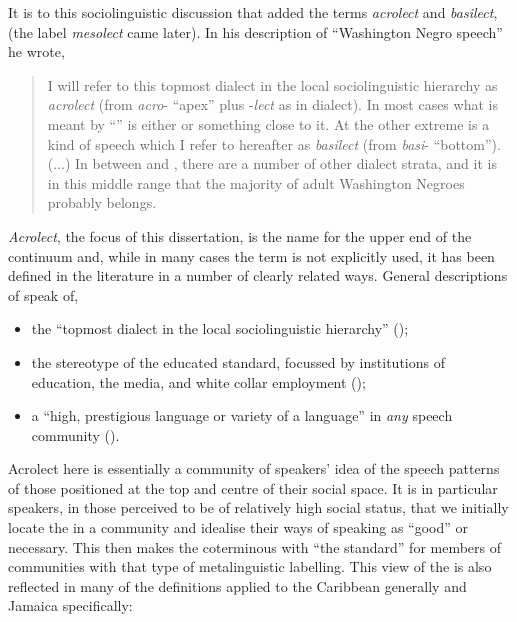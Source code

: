 It is to this sociolinguistic discussion that \citet[15--16]{Stewart1965} added the terms \textit{acrolect} and \textit{basilect}, (the label \textit{mesolect} came later).  In his description of “Washington Negro speech” he wrote,

\begin{quote}
I will refer to this topmost dialect in the local sociolinguistic hierarchy as \textit{acrolect} (from \textit{acro}- “apex” plus -\textit{lect} as in dialect).  In most cases what is meant by “” is either  or something close to it.  At the other extreme is a kind of speech which I refer to hereafter as \textit{basilect} (from \textit{basi}- “bottom”). (...) In between  and , there are a number of other dialect strata, and it is in this middle range that the majority of adult Washington Negroes probably belongs.  
\end{quote}

\textit{Acrolect}, the focus of this dissertation, is the name for the upper end of the continuum and, while in many cases the term is not explicitly used, it has been defined in the literature in a number of clearly related ways.  General descriptions of  speak of,  

\begin{itemize}
\item the “topmost dialect in the local sociolinguistic hierarchy” (\citealt[15]{Stewart1965});   
\item the stereotype of the educated standard, focussed by institutions of education, the media, and white collar employment (\citealt[34--35]{LePage1988});
\item a “high, prestigious language or variety of a language” in \textit{any} speech community (\citealt[xvii]{McArthur1998}).
\end{itemize}

Acrolect here is essentially a community of speakers’ idea of the speech patterns of those positioned at the top and centre of their social space.  It is in particular speakers, in those perceived to be of relatively high social status, that we initially locate the  in a community and idealise their ways of speaking as “good” or necessary.  This then makes the  coterminous with “the standard” for members of communities with that type of metalinguistic labelling.  This view of the  is also reflected in many of the definitions applied to the Caribbean generally and Jamaica specifically:        

